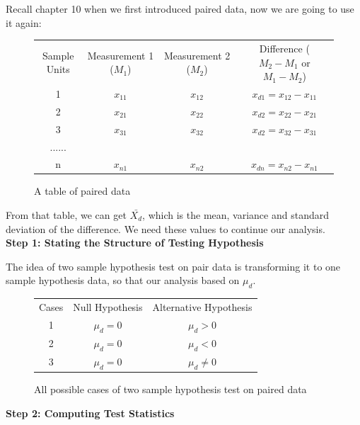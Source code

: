 Recall chapter 10 when we first introduced paired data, now we are going to use it again:
\begin{center}
\begin{figure}[H]
\centering
\begin{tabular}{ c c c c }
 Sample Units & Measurement 1 ($M_1$) & Measurement 2 ($M_2$) & Difference ($M_2 - M_1$ or $M_1 - M_2$)\\ 
 1 & $x_{11}$ & $x_{12}$ & $x_{d1} = x_{12} -  x_{11}$\\  
 2 & $x_{21}$ & $x_{22}$ & $x_{d2} = x_{22} -  x_{21}$\\
 3 & $x_{31}$ & $x_{32}$ & $x_{d2} = x_{32} -  x_{31}$\\
 ......\\
 n & $x_{n1}$ & $x_{n2}$ & $x_{dn} = x_{n2} -  x_{n1}$\\
\end{tabular}
\caption{A table of paired data}
\end{figure}
\end{center}
\vspace{-0.75cm}

From that table, we can get $\bar{X_d}$, which is the mean, variance and standard deviation of the difference. We need these values to continue our analysis.\\

\textbf{Step 1: Stating the Structure of Testing Hypothesis}

The idea of two sample hypothesis test on pair data is transforming it to one sample hypothesis data, so that our analysis based on $\mu_d$.

\begin{center}
\begin{figure}[H]
\centering
\begin{tabular}{ c c c }
Cases & Null Hypothesis & Alternative Hypothesis \\
     1	   & $\mu_d = 0$ & $\mu_d > 0$ \\
     2	   & $\mu_d = 0$ & $\mu_d < 0$ \\
     3    & $\mu_d = 0$ & $\mu_d \neq 0$ \\
\end{tabular}
\caption{All possible cases of two sample hypothesis test on paired data}
\end{figure}
\end{center}
\vspace{-0.75cm}

\textbf{Step 2: Computing Test Statistics}

